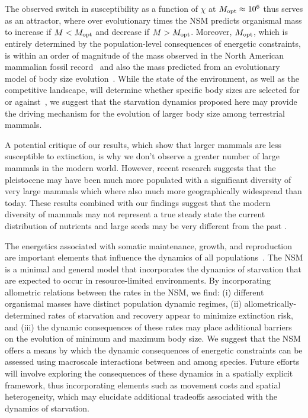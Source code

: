 \documentclass{pnastwo}
\begin{document}
\begin{article}
The observed switch in susceptibility as a function of $\chi$ at
$M_{\rm opt}\approx10^6$ thus serves as an attractor, where over evolutionary
times the NSM predicts organismal mass to increase if $M<M_{\rm opt}$ and
decrease if $M>M_{\rm opt}$.  Moreover, $M_{\rm opt}$, which is entirely
determined by the population-level consequences of energetic constraints, is
within an order of magnitude of the mass observed in the North American
mammalian fossil record~\cite{Alroy:1998p1594} and also the mass predicted
from an evolutionary model of body size evolution~\cite{Clauset:2009fh}.
While the state of the environment, as well as the competitive landscape,
will determine whether specific body sizes are selected for or
against~\cite{Saarinen:2014br}, we suggest that the starvation dynamics
proposed here may provide the driving mechanism for the evolution of larger
body size among terrestrial mammals.

A potential critique of our results, which show that larger mammals are less susceptible to extinction, is why we don't observe a greater number of large mammals in the modern world. However, recent research suggests that the pleistocene may have been much more populated with a significant diversity of very large mammals \cite{Doughty:2013kd,Doughty:2015hy,Doughty:2015je} which where also much more geographically widespread than today. These results combined with our findings suggest that the modern diversity of mammals may not represent a true steady state the current distribution of nutrients and large seeds may be very different from the past \cite{Doughty:2013kd,Doughty:2015hy,Doughty:2015je}. 

The energetics associated with somatic maintenance, growth, and reproduction
are important elements that influence the dynamics of all
populations~\cite{Stearns:1989ip}.  The NSM is a minimal and general model
that incorporates the dynamics of starvation that are expected to occur in
resource-limited environments.  By incorporating allometric relations between
the rates in the NSM, we find: (i) different organismal masses have distinct
population dynamic regimes, (ii) allometrically-determined rates of
starvation and recovery appear to minimize extinction risk, and (iii) the
dynamic consequences of these rates may place additional barriers on the
evolution of minimum and maximum body size.  We suggest that the NSM offers a
means by which the dynamic consequences of energetic constraints can be
assessed using macroscale interactions between and among species.  Future
efforts will involve exploring the consequences of these dynamics in a
spatially explicit framework, thus incorporating elements such as movement
costs and spatial heterogeneity, which may elucidate additional tradeoffs
associated with the dynamics of starvation.


\end{article}
\end{document}
